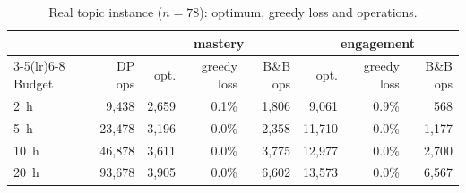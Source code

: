 \begin{table}[h]
\centering
\caption{Real topic instance ($n=78$): optimum, greedy loss and operations.}\label{tab:topics}
\small
\begin{tabular}{@{}l r rrr rrr@{}}
\toprule
 & & \multicolumn{3}{c}{mastery} & \multicolumn{3}{c}{engagement}\\
\cmidrule(lr){3-5}\cmidrule(lr){6-8}
Budget & DP ops & opt. & greedy loss & B\&B ops & opt. & greedy loss & B\&B ops\\
\midrule
2~h & 9,438 & 2,659 & 0.1\% & 1,806 & 9,061 & 0.9\% & 568\\
5~h & 23,478 & 3,196 & 0.0\% & 2,358 & 11,710 & 0.0\% & 1,177\\
10~h & 46,878 & 3,611 & 0.0\% & 3,775 & 12,977 & 0.0\% & 2,700\\
20~h & 93,678 & 3,905 & 0.0\% & 6,602 & 13,573 & 0.0\% & 6,567\\
\bottomrule
\end{tabular}
\end{table}
